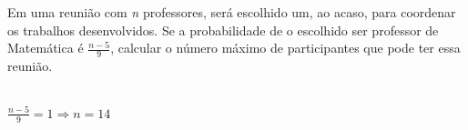 \begin{ex}
Em uma reunião com \textit{n} professores,  será escolhido um, ao acaso, para coordenar os trabalhos desenvolvidos. Se a probabilidade de o escolhido ser professor de Matemática é $\frac{n-5}{9}$, calcular o número máximo de participantes que pode ter essa reunião.
  \begin{sol}
   \phantom{A} \\
   $\frac{n-5}{9}=1 \Longrightarrow n=14$
  \end{sol}
\end{ex}